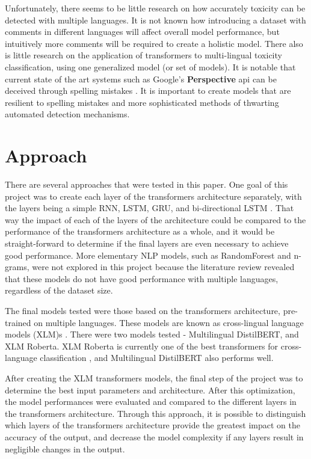 \documentclass{article}
\begin{document}
Unfortunately, there seems to be little research on how accurately toxicity can be detected with multiple languages. It is not known how introducing a dataset with comments in different languages will affect overall model performance, but intuitively more comments will be required to create a holistic model. There also is little research on the application of transformers to multi-lingual toxicity classification, using one generalized model (or set of models). It is notable that current state of the art systems such as Google's \textbf{Perspective} api can be deceived through spelling mistakes \cite{hosseini2017deceiving}. It is important to create models that are resilient to spelling mistakes and more sophisticated methods of thwarting automated detection mechanisms.

\section{Approach}

There are several approaches that were tested in this paper. One goal of this project was to create each layer of the transformers architecture separately, with the layers being a simple RNN, LSTM, GRU, and bi-directional LSTM \cite{lample2019crosslingual}. That way the impact of each of the layers of the architecture could be compared to the performance of the transformers architecture as a whole, and it would be straight-forward to determine if the final layers are even necessary to achieve good performance. More elementary NLP models, such as RandomForest and n-grams, were not explored in this project because the literature review revealed that these models do not have good performance with multiple languages, regardless of the dataset size.

The final models tested were those based on the transformers architecture, pre-trained on multiple languages. These models are known as cross-lingual language models (XLM)s \cite{lample2019crosslingual}. There were two models tested - Multilingual DistilBERT, and XLM Roberta. XLM Roberta is currently one of the best transformers for cross-language classification \cite{deep_learning_approaches}, and Multilingual DistilBERT also performs well.

After creating the XLM transformers models, the final step of the project was to determine the best input parameters and architecture. After this optimization, the model performances were evaluated and compared to the different layers in the transformers architecture. Through this approach, it is possible to distinguish which layers of the transformers architecture provide the greatest impact on the accuracy of the output, and decrease the model complexity if any layers result in negligible changes in the output.
\end{document}
